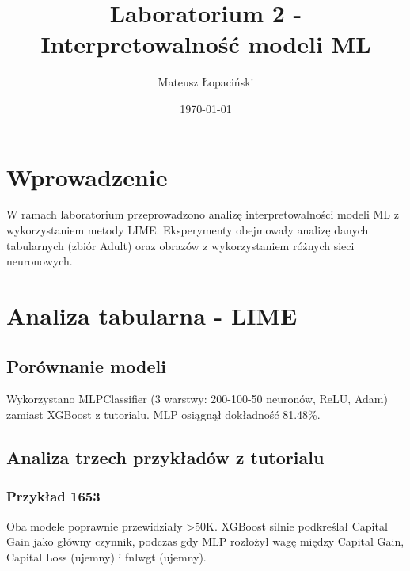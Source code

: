 \documentclass[12pt,a4paper]{article}
\title{Laboratorium 2 - Interpretowalność modeli ML}
\author{Mateusz Łopaciński}
\date{\today}
\begin{document}
\maketitle

\section{Wprowadzenie}

W ramach laboratorium przeprowadzono analizę interpretowalności modeli ML z wykorzystaniem metody LIME. Eksperymenty obejmowały analizę danych tabularnych (zbiór Adult) oraz obrazów z wykorzystaniem różnych sieci neuronowych.

\section{Analiza tabularna - LIME}

\subsection{Porównanie modeli}

Wykorzystano MLPClassifier (3 warstwy: 200-100-50 neuronów, ReLU, Adam) zamiast XGBoost z tutorialu. MLP osiągnął dokładność 81.48\%.

\subsection{Analiza trzech przykładów z tutorialu}

\subsubsection{Przykład 1653}

Oba modele poprawnie przewidziały >50K. XGBoost silnie podkreślał Capital Gain jako główny czynnik, podczas gdy MLP rozłożył wagę między Capital Gain, Capital Loss (ujemny) i fnlwgt (ujemny).
\end{document}
